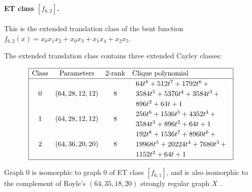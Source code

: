 \documentclass[12pt,a4paper]{article}
\begin{document}
\paragraph*{ET class $[f_{6,2}]$.}
%
This is the extended translation class of the bent function
$f_{6,2}(x) = x_{0} x_{1} x_{2} + x_{0} x_{3} + x_{1} x_{4} + x_{2} x_{5}$.

The extended translation class contains
three extended Cayley classes:

\begin{table}[!bhpt] %
\small{}
\begin{align*}
\def\arraystretch{1.2}
\begin{array}{|cccl|}
\hline
\text{Class} &
\text{Parameters} &
\text{2-rank} &
\text{Clique polynomial}
\\
\hline
0 &
(64, 28, 12, 12) &
8 &
\begin{array}{l}
64t^{8} + 512t^{7} + 1792t^{6}
\,+
\\
 3584t^{5} + 5376t^{4} + 3584t^{3}
\,+
\\
 896t^{2} + 64t + 1
\end{array}
\\
1 &
(64, 28, 12, 12) &
8 &
\begin{array}{l}
256t^{6} + 1536t^{5} + 4352t^{4}
\,+
\\
 3584t^{3} + 896t^{2} + 64t + 1
\end{array}
\\
2 &
(64, 36, 20, 20) &
8 &
\begin{array}{l}
192t^{8} + 1536t^{7} + 8960t^{6}
\,+
\\
 19968t^{5} + 20224t^{4} + 7680t^{3}
\,+
\\
 1152t^{2} + 64t + 1
\end{array}
\\
\hline
\end{array}
\end{align*}
\caption{$f_{6,2}$ extended Cayley classes}
\label{tab-c6_2_EC_classes}
\end{table}


Graph 0 is isomorphic to graph 0 of ET class $[f_{6,1}]$,
and is also isomorphic to the complement of Royle's $(64,35,18,20)$ strongly regular graph $X$
\cite{Roy08normal}.
%
%
\end{document}
